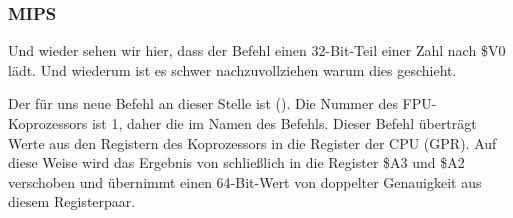 \subsubsection{MIPS}


Und wieder sehen wir hier, dass der Befehl  einen 32-Bit-Teil einer
\Tdouble Zahl nach \$V0 lädt.
Und wiederum ist es schwer nachzuvollziehen warum dies geschieht.

Der für uns neue Befehl an dieser Stelle ist (). Die Nummer des FPU-Koprozessors ist 1, daher die  im Namen des
Befehls. 
Dieser Befehl überträgt Werte aus den Registern des Koprozessors in die Register
der CPU (\ac{GPR}).
Auf diese Weise wird das Ergebnis von  schließlich in die Register
\$A3 und \$A2 verschoben und \printf übernimmt einen 64-Bit-Wert von doppelter
Genauigkeit aus diesem Registerpaar.